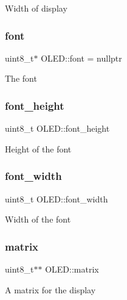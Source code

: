 Width of display \hypertarget{class_o_l_e_d_a29ab86a4a73f4d343bf1810927f0911d}{}\label{class_o_l_e_d_a29ab86a4a73f4d343bf1810927f0911d} 
\subsubsection{\texorpdfstring{font}{font}}
{\footnotesize\ttfamily uint8\+\_\+t$\ast$ O\+L\+E\+D\+::font = nullptr\hspace{0.3cm}{\ttfamily [private]}}

The font \hypertarget{class_o_l_e_d_a85b91421932866dea031921799ba83a3}{}\label{class_o_l_e_d_a85b91421932866dea031921799ba83a3} 
\subsubsection{\texorpdfstring{font\+\_\+height}{font\_height}}
{\footnotesize\ttfamily uint8\+\_\+t O\+L\+E\+D\+::font\+\_\+height\hspace{0.3cm}{\ttfamily [private]}}

Height of the font \hypertarget{class_o_l_e_d_a3c9ea103adf6c860a2534135e9a25ba8}{}\label{class_o_l_e_d_a3c9ea103adf6c860a2534135e9a25ba8} 
\subsubsection{\texorpdfstring{font\+\_\+width}{font\_width}}
{\footnotesize\ttfamily uint8\+\_\+t O\+L\+E\+D\+::font\+\_\+width\hspace{0.3cm}{\ttfamily [private]}}

Width of the font \hypertarget{class_o_l_e_d_a9d32e21189940afba24deab0a2bc0126}{}\label{class_o_l_e_d_a9d32e21189940afba24deab0a2bc0126} 
\subsubsection{\texorpdfstring{matrix}{matrix}}
{\footnotesize\ttfamily uint8\+\_\+t$\ast$$\ast$ O\+L\+E\+D\+::matrix\hspace{0.3cm}{\ttfamily [private]}}

A matrix for the display \hypertarget{class_o_l_e_d_a9ea1c55112deede1a61142af276a6bc9}{}\label{class_o_l_e_d_a9ea1c55112deede1a61142af276a6bc9} 
